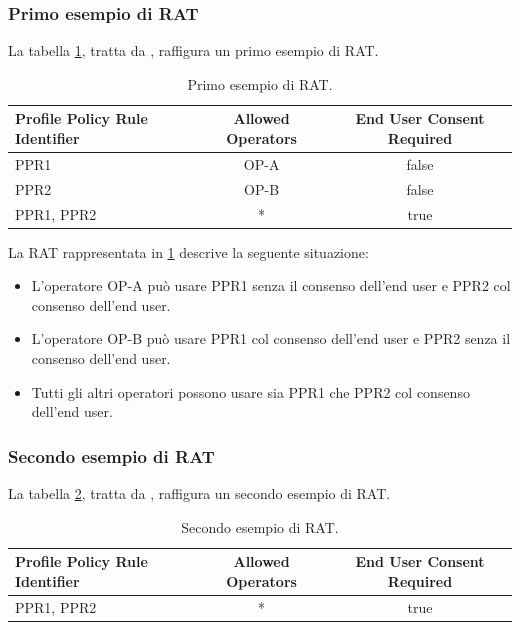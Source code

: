 \documentclass[10pt, oneside]{book}
\begin{document}
\subsubsection{Primo esempio di RAT}
La tabella \ref{tab:rat1}, tratta da \cite{GSMA-docs-new}, raffigura un primo esempio di RAT.\\
\begin{table}[h!]
\begin{center}
\captionsetup{skip=4pt}
\caption{Primo esempio di RAT.}
\label{tab:rat1}
\begin{tabularx}{\textwidth}{|X|c|c|} %
\hline
\textbf{Profile Policy Rule Identifier} & \textbf{Allowed Operators} & \textbf{End User Consent Required}\\
\hline
PPR1 & OP-A & false\\
\hline
PPR2 & OP-B & false\\
\hline
PPR1, PPR2 & * & true\\
\hline
\end{tabularx}
\end{center}
\end{table}

La RAT rappresentata in \ref{tab:rat1} descrive la seguente situazione:
\begin{itemize}
\item L'operatore OP-A può usare PPR1 senza il consenso dell'end user e PPR2 col consenso dell'end user.
\item L'operatore OP-B può usare PPR1 col consenso dell'end user e PPR2 senza il consenso dell'end user.
\item Tutti gli altri operatori possono usare sia PPR1 che PPR2 col consenso dell'end user.
\end{itemize}

\subsubsection{Secondo esempio di RAT}
La tabella \ref{tab:rat2}, tratta da \cite{GSMA-docs-new}, raffigura un secondo esempio di RAT.\\
\begin{table}[h!]
\begin{center}
\captionsetup{skip=4pt}
\caption{Secondo esempio di RAT.}
\label{tab:rat2}
\begin{tabularx}{\textwidth}{|X|c|c|} %
\hline
\textbf{Profile Policy Rule Identifier} & \textbf{Allowed Operators} & \textbf{End User Consent Required}\\
\hline
PPR1, PPR2 & * & true\\
\hline
\end{tabularx}
\end{center}
\end{table}
\end{document}
